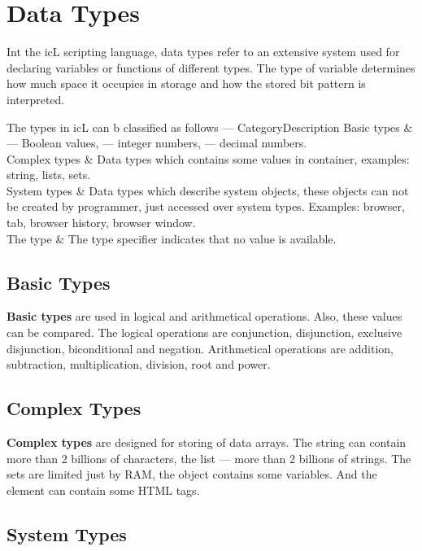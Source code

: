 \section{Data Types}

Int the icL scripting language, data types refer to an extensive system used for declaring variables or functions of different types. The type of variable determines how much space it occupies in storage and how the stored bit pattern is interpreted.

The types in icL can b classified as follows —
\stabletwo{3.5cm}{13.6cm}
{}{}{Category}{Description}
{
	Basic types      &  \bool{} — Boolean values, \integer{} — integer numbers, \double{} — decimal numbers. \\ \hline
	Complex types    & Data types which contains some values in container, examples: string, lists, sets. \\ \hline
	System types     & Data types which describe system objects, these objects can not be created by programmer, just accessed over system types. Examples: browser, tab, browser history, browser window. \\ \hline
	The \void{} type & The type specifier \void{} indicates that no value is available.
}

\subsection{Basic Types}

{\bf Basic types} are used in logical and arithmetical operations. Also, these values can be compared. The logical operations are conjunction, disjunction, exclusive disjunction, biconditional and negation. Arithmetical operations are addition, subtraction, multiplication, division, root and power.

\subsection{Complex Types}

{\bf Complex types} are designed for storing of data arrays. The string can contain more than 2 billions of characters, the list — more than 2 billions of strings. The sets are limited just by RAM, the object contains some variables. And the element can contain some HTML tags.

\subsection{System Types}


